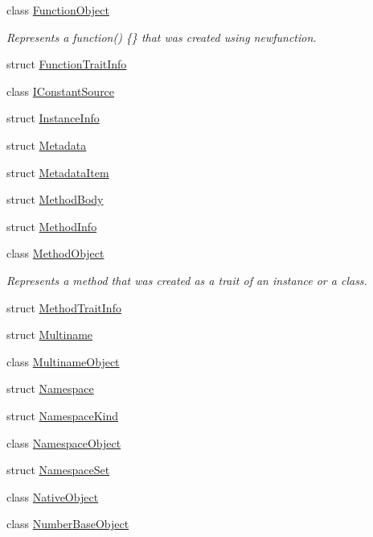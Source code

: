 \begin{DoxyCompactItemize}
class \hyperlink{classjswf_1_1avm2_1_1_function_object}{Function\+Object}
\begin{DoxyCompactList}\small\item\em Represents a {\ttfamily function() \{\}} that was created using {\ttfamily newfunction}. \end{DoxyCompactList}\item 
struct \hyperlink{structjswf_1_1avm2_1_1_function_trait_info}{Function\+Trait\+Info}
\item 
class \hyperlink{classjswf_1_1avm2_1_1_i_constant_source}{I\+Constant\+Source}
\item 
struct \hyperlink{structjswf_1_1avm2_1_1_instance_info}{Instance\+Info}
\item 
struct \hyperlink{structjswf_1_1avm2_1_1_metadata}{Metadata}
\item 
struct \hyperlink{structjswf_1_1avm2_1_1_metadata_item}{Metadata\+Item}
\item 
struct \hyperlink{structjswf_1_1avm2_1_1_method_body}{Method\+Body}
\item 
struct \hyperlink{structjswf_1_1avm2_1_1_method_info}{Method\+Info}
\item 
class \hyperlink{classjswf_1_1avm2_1_1_method_object}{Method\+Object}
\begin{DoxyCompactList}\small\item\em Represents a method that was created as a trait of an instance or a class. \end{DoxyCompactList}\item 
struct \hyperlink{structjswf_1_1avm2_1_1_method_trait_info}{Method\+Trait\+Info}
\item 
struct \hyperlink{structjswf_1_1avm2_1_1_multiname}{Multiname}
\item 
class \hyperlink{classjswf_1_1avm2_1_1_multiname_object}{Multiname\+Object}
\item 
struct \hyperlink{structjswf_1_1avm2_1_1_namespace}{Namespace}
\item 
struct \hyperlink{structjswf_1_1avm2_1_1_namespace_kind}{Namespace\+Kind}
\item 
class \hyperlink{classjswf_1_1avm2_1_1_namespace_object}{Namespace\+Object}
\item 
struct \hyperlink{structjswf_1_1avm2_1_1_namespace_set}{Namespace\+Set}
\item 
class \hyperlink{classjswf_1_1avm2_1_1_native_object}{Native\+Object}
\item 
class \hyperlink{classjswf_1_1avm2_1_1_number_base_object}{Number\+Base\+Object}

\end{DoxyCompactItemize}

